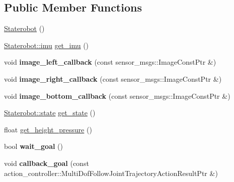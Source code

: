 \subsection*{\-Public \-Member \-Functions}
\begin{DoxyCompactItemize}
\item 
\hyperlink{class_staterobot_ab99a92f98d724c96989a744aee273155}{\-Staterobot} ()
\item 
\hyperlink{struct_staterobot_1_1imu}{\-Staterobot\-::imu} \hyperlink{class_staterobot_a05732dbb16bda2339b88a7c60fa2b7ad}{get\-\_\-imu} ()
\item 
\hypertarget{class_staterobot_a4cb41f60186d02b210f354d0199584a4}{void {\bfseries image\-\_\-left\-\_\-callback} (const sensor\-\_\-msgs\-::\-Image\-Const\-Ptr \&)}\label{class_staterobot_a4cb41f60186d02b210f354d0199584a4}

\item 
\hypertarget{class_staterobot_af908b8a70811f3c0a48efe323610602d}{void {\bfseries image\-\_\-right\-\_\-callback} (const sensor\-\_\-msgs\-::\-Image\-Const\-Ptr \&)}\label{class_staterobot_af908b8a70811f3c0a48efe323610602d}

\item 
\hypertarget{class_staterobot_a8ad49fe9f855e5874d8736067fa7fac0}{void {\bfseries image\-\_\-bottom\-\_\-callback} (const sensor\-\_\-msgs\-::\-Image\-Const\-Ptr \&)}\label{class_staterobot_a8ad49fe9f855e5874d8736067fa7fac0}

\item 
\hyperlink{struct_staterobot_1_1state}{\-Staterobot\-::state} \hyperlink{class_staterobot_a2dd739316c9cf438b13e21543aaff91f}{get\-\_\-state} ()
\item 
float \hyperlink{class_staterobot_a0318f7abf24c5c60aee915224af6af02}{get\-\_\-height\-\_\-pressure} ()
\item 
\hypertarget{class_staterobot_a4a44c24dd5cdb773aa40772d02b41720}{bool {\bfseries wait\-\_\-goal} ()}\label{class_staterobot_a4a44c24dd5cdb773aa40772d02b41720}

\item 
\hypertarget{class_staterobot_a37cbdfcb1cc30194f0fa0742952a0aad}{void {\bfseries callback\-\_\-goal} (const action\-\_\-controller\-::\-Multi\-Dof\-Follow\-Joint\-Trajectory\-Action\-Result\-Ptr \&)}\label{class_staterobot_a37cbdfcb1cc30194f0fa0742952a0aad}


\end{DoxyCompactItemize}
